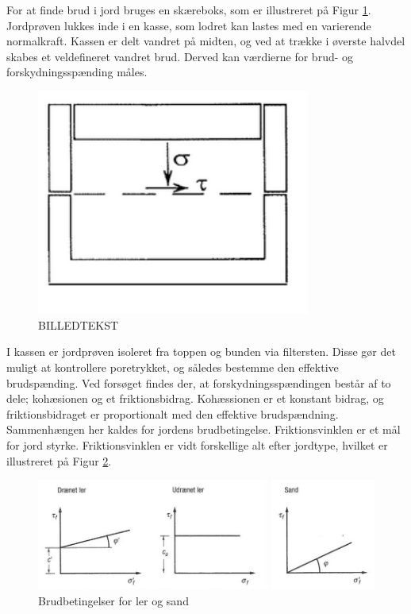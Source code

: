 For at finde brud i jord bruges en skæreboks, som er illustreret på Figur \ref{fig:forskudningsspanding}. Jordprøven lukkes inde i en kasse, som lodret kan lastes med en varierende normalkraft. Kassen er delt vandret på midten, og ved at trække i øverste halvdel skabes et veldefineret vandret brud. Derved kan værdierne for brud- og forskydningsspænding måles.\citep{DGF}

\begin{figure}[htbp] \centering
	\begin{minipage}[b]{0.48\textwidth}\centering
		\includegraphics[width=0.8\textwidth]{billeder/forskud.png}
		\caption{BILLEDTEKST}
		\label{fig:forskudningsspanding}
	\end{minipage}\hfill
\end{figure}

\indent{     }  I kassen er jordprøven isoleret fra toppen og bunden via filtersten. Disse gør det muligt at kontrollere poretrykket, og således bestemme den effektive brudspænding. Ved forsøget findes der, at forskydningsspændingen består af to dele; kohæsionen og et friktionsbidrag. Kohæssionen er et konstant bidrag, og friktionsbidraget er proportionalt med den effektive brudspændning. Sammenhængen her kaldes for jordens brudbetingelse.\citep{geoteknik}
\newline \indent{     }  Friktionsvinklen er et mål for jord styrke. Friktionsvinklen er vidt forskellige alt efter jordtype, hvilket er illustreret på Figur \ref{fig:friktionsvinkler}.   

\begin{figure}[htbp] \centering
	\begin{minipage}[b]{0.48\textwidth}\centering
		\includegraphics[width=1.0\textwidth]{billeder/friktionsvinkeller.png}
		\caption{Brudbetingelser for ler og sand \citep{geoteknik}}
		\label{fig:friktionsvinkler}
	\end{minipage}\hfill
\end{figure}
